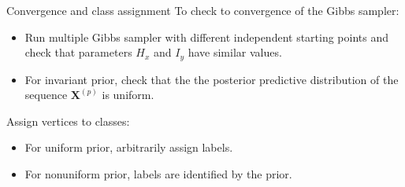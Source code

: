 \documentclass[aspectratio=169,xcolor=dvipsnames]{beamer}
\newcommand{\matx}{\textbf{X}}
\begin{document}
\begin{frame}{Convergence and class assignment}
\vspace{-15pt}
To check to convergence of the Gibbs sampler:

\begin{itemize}
    \item Run multiple Gibbs sampler with different independent starting points and check that parameters $H_x $ and $I_y $ have similar values.
    
    \item For invariant prior, check that the the posterior predictive distribution of the sequence $\matx^{(p)}$ is uniform.
\end{itemize}
\vspace{10pt}

Assign vertices to classes:

\begin{itemize}
    \item For uniform prior, arbitrarily assign labels.
    
    \item For nonuniform prior, labels are identified by the prior.
\end{itemize}

\end{frame}
\end{document}
